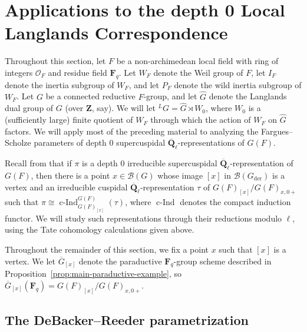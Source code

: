 \documentclass[reqno]{amsart}
\numberwithin{equation}{subsection}
\newcommand{\F}{\mathbf{F}}
\newcommand{\Q}{\mathbf{Q}}
\newcommand{\Z}{\mathbf{Z}}
\newcommand{\ol}[1]{\overline{#1}}
\newcommand{\wh}[1]{\widehat{#1}}
\newcommand{\ld}{{}^L}
\newcommand\cB{\mathcal{B}}
\newcommand\cO{\mathcal{O}}
\DeclareMathOperator{\cInd}{c-Ind}
\DeclareMathOperator{\der}{der}
\theoremstyle{remark}
\numberwithin{equation}{subsection}
\numberwithin{figure}{subsection}
\begin{document}
\section{Applications to the depth 0 Local Langlands Correspondence}\label{section:debacker-reeder}

Throughout this section, let $F$ be a non-archimedean local field with ring of integers $\cO_F$ and residue field $\F_q$. Let $W_F$ denote the Weil group of $F$, let $I_F$ denote the inertia subgroup of $W_F$, and let $P_F$ denote the wild inertia subgroup of $W_F$. Let $G$ be a connected reductive $F$-group, and let $\wh G$ denote the Langlands dual group of $G$ (over $\Z$, say). We will let $\ld G = \wh G \rtimes W_0$, where $W_0$ is a (sufficiently large) finite quotient of $W_F$ through which the action of $W_F$ on $\wh G$ factors. We will apply most of the preceding material to analyzing the Fargues--Scholze parameters of depth $0$ supercuspidal $\ol\Q_\ell$-representations of $G(F)$.

Recall from \cite[Proposition~6.8]{MP96} that if $\pi$ is a depth $0$ irreducible supercuspidal $\ol\Q_\ell$-representation of $G(F)$, then there is a point $x \in \cB(G)$ whose image $[x]$ in $\cB(G_{\der})$ is a vertex and an irreducible cuspidal $\ol\Q_\ell$-representation $\tau$ of $G(F)_{[x]}/G(F)_{x,0+}$ such that $\pi \cong \cInd_{G(F)_{[x]}}^{G(F)}(\tau)$, where $\cInd$ denotes the compact induction functor. We will study such representations through their reductions modulo $\ell$, using the Tate cohomology calculations given above.

Throughout the remainder of this section, we fix a point $x$ such that $[x]$ is a vertex. We let $\ol G_{[x]}$ denote the paraductive $\F_q$-group scheme described in Proposition~\ref{prop:main-paraductive-example}, so $\ol G_{[x]}(\F_q) = G(F)_{[x]}/G(F)_{x,0+}$.

\subsection{The DeBacker--Reeder parametrization}\label{ss:dr}
\end{document}
